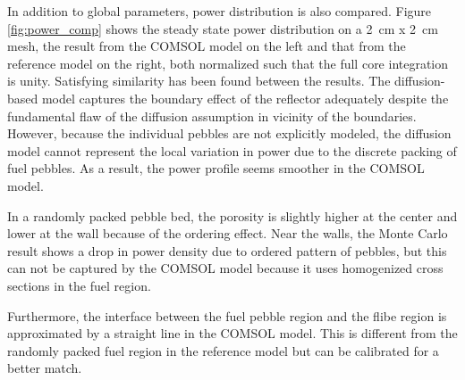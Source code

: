 \documentclass{elsarticle}
\begin{document}
In addition to global parameters, power distribution is also compared. Figure \ref{fig:power_comp} shows the steady state power distribution on a 2~cm x 2~cm mesh, the result from the COMSOL model on the left and that from the reference model on the right, both normalized such that the full core integration is unity. 
Satisfying similarity has been found between the results. The diffusion-based model captures the boundary effect of the reflector adequately despite the fundamental flaw of the diffusion assumption in vicinity of the boundaries. However, because the individual pebbles are not explicitly modeled, the diffusion model cannot represent the local variation in power due to the discrete packing of fuel pebbles. As a result, the power profile seems smoother in the COMSOL model. 

In a randomly packed pebble bed, the porosity is slightly higher at the center and lower at the wall because of the ordering effect. Near the walls, the Monte Carlo result shows a drop in power density due to ordered pattern of pebbles, but this can not be captured by the COMSOL model because it uses homogenized cross sections in the fuel region.

Furthermore, the interface between the fuel pebble region and the flibe region is approximated by a straight line in the COMSOL model. This is different from the randomly packed fuel region in the reference model but can be calibrated for a better match. 
\end{document}

